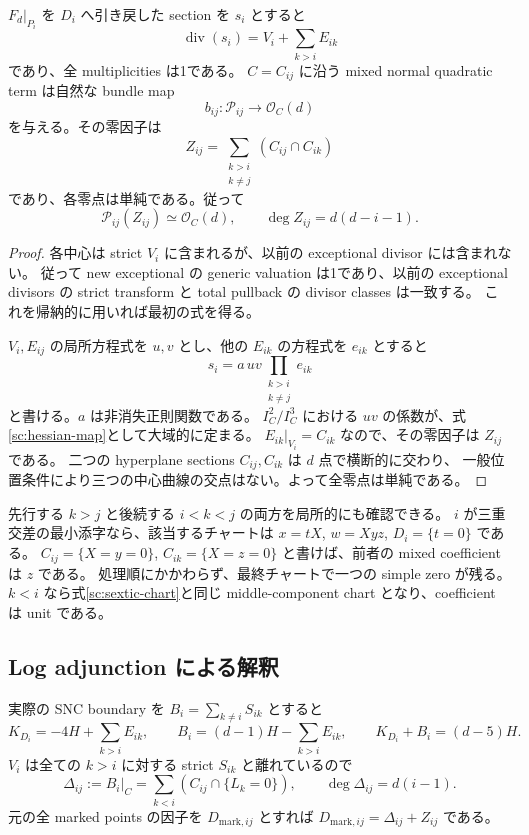 \begin{theorem}\label{sc:mixed-hessian}
$F_d|_{P_i}$ を $D_i$ へ引き戻した section を $s_i$ とすると
\[
 \operatorname{div}(s_i)=V_i+\sum_{k>i}E_{ik}
\]
であり、全 multiplicities は1である。
$C=C_{ij}$ に沿う mixed normal quadratic term は自然な bundle map
\begin{equation}\label{sc:hessian-map}
 b_{ij}:\mathcal P_{ij}\longrightarrow\mathcal O_C(d)
\end{equation}
を与える。その零因子は
\[
 Z_{ij}=\sum_{\substack{k>i\\k\ne j}}(C_{ij}\cap C_{ik})
\]
であり、各零点は単純である。従って
\[
 \mathcal P_{ij}(Z_{ij})\simeq\mathcal O_C(d),\qquad
 \deg Z_{ij}=d(d-i-1).
\]
\end{theorem}

\begin{proof}
各中心は strict $V_i$ に含まれるが、以前の exceptional divisor には含まれない。
従って new exceptional の generic valuation は1であり、以前の exceptional divisors の
strict transform と total pullback の divisor classes は一致する。
これを帰納的に用いれば最初の式を得る。

$V_i,E_{ij}$ の局所方程式を $u,v$ とし、他の $E_{ik}$ の方程式を $e_{ik}$ とすると
\[
 s_i=a\,uv\prod_{\substack{k>i\\k\ne j}}e_{ik}
\]
と書ける。$a$ は非消失正則関数である。
$I_C^2/I_C^3$ における $uv$ の係数が、式\eqref{sc:hessian-map}として大域的に定まる。
$E_{ik}|_{V_i}=C_{ik}$ なので、その零因子は $Z_{ij}$ である。
二つの hyperplane sections $C_{ij},C_{ik}$ は $d$ 点で横断的に交わり、
一般位置条件により三つの中心曲線の交点はない。よって全零点は単純である。
\end{proof}

先行する $k>j$ と後続する $i<k<j$ の両方を局所的にも確認できる。
$i$ が三重交差の最小添字なら、該当するチャートは $x=tX$, $w=Xyz$, $D_i=\{t=0\}$ である。
$C_{ij}=\{X=y=0\}$, $C_{ik}=\{X=z=0\}$ と書けば、前者の mixed coefficient は $z$ である。
処理順にかかわらず、最終チャートで一つの simple zero が残る。
$k<i$ なら式\eqref{sc:sextic-chart}と同じ middle-component chart となり、coefficient は unit である。

\subsection{Log adjunction による解釈}

実際の SNC boundary を $B_i=\sum_{k\ne i}S_{ik}$ とすると
\[
 K_{D_i}=-4H+\sum_{k>i}E_{ik},\qquad
 B_i=(d-1)H-\sum_{k>i}E_{ik},\qquad
 K_{D_i}+B_i=(d-5)H.
\]
$V_i$ は全ての $k>i$ に対する strict $S_{ik}$ と離れているので
\[
 \Delta_{ij}:=B_i|_C=\sum_{k<i}(C_{ij}\cap\{L_k=0\}),
 \qquad \deg\Delta_{ij}=d(i-1).
\]
元の全 marked points の因子を $D_{\mathrm{mark},ij}$ とすれば
$D_{\mathrm{mark},ij}=\Delta_{ij}+Z_{ij}$ である。

